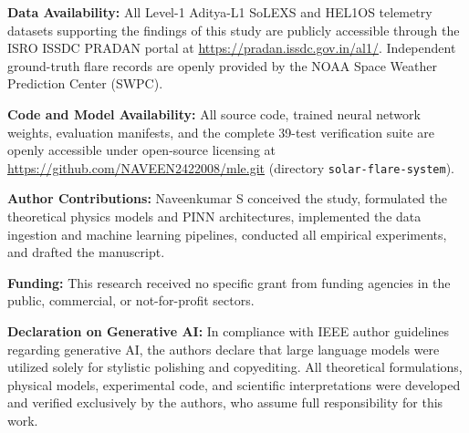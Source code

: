 \documentclass[11pt,a4paper,twocolumn]{article}
\begin{document}
\vspace{0.4em}
\noindent \textbf{Data Availability:} All Level-1 Aditya-L1 SoLEXS and HEL1OS telemetry datasets supporting the findings of this study are publicly accessible through the ISRO ISSDC PRADAN portal at \url{https://pradan.issdc.gov.in/al1/}. Independent ground-truth flare records are openly provided by the NOAA Space Weather Prediction Center (SWPC).

\vspace{0.4em}
\noindent \textbf{Code and Model Availability:} All source code, trained neural network weights, evaluation manifests, and the complete 39-test verification suite are openly accessible under open-source licensing at \url{https://github.com/NAVEEN2422008/mle.git} (directory \texttt{solar-flare-system}).

\vspace{0.4em}
\noindent \textbf{Author Contributions:} Naveenkumar S conceived the study, formulated the theoretical physics models and PINN architectures, implemented the data ingestion and machine learning pipelines, conducted all empirical experiments, and drafted the manuscript.

\vspace{0.4em}
\noindent \textbf{Funding:} This research received no specific grant from funding agencies in the public, commercial, or not-for-profit sectors.

\vspace{0.4em}
\noindent \textbf{Declaration on Generative AI:} In compliance with IEEE author guidelines regarding generative AI, the authors declare that large language models were utilized solely for stylistic polishing and copyediting. All theoretical formulations, physical models, experimental code, and scientific interpretations were developed and verified exclusively by the authors, who assume full responsibility for this work.


\end{document}
